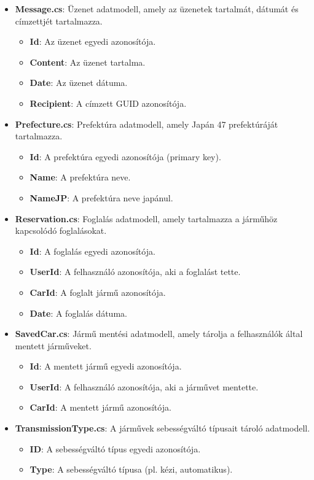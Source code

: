 \documentclass{report}[11pt]
\begin{document}
\begin{itemize}
\item \textbf{Message.cs}: Üzenet adatmodell, amely az üzenetek tartalmát, dátumát és címzettjét tartalmazza.
\begin{itemize}
    \item \textbf{Id}: Az üzenet egyedi azonosítója.
    \item \textbf{Content}: Az üzenet tartalma.
    \item \textbf{Date}: Az üzenet dátuma.
    \item \textbf{Recipient}: A címzett GUID azonosítója.
\end{itemize}

\item \textbf{Prefecture.cs}: Prefektúra adatmodell, amely Japán 47 prefektúráját tartalmazza.
\begin{itemize}
    \item \textbf{Id}: A prefektúra egyedi azonosítója (primary key).
    \item \textbf{Name}: A prefektúra neve.
    \item \textbf{NameJP}: A prefektúra neve japánul.
\end{itemize}

\item \textbf{Reservation.cs}: Foglalás adatmodell, amely tartalmazza a járműhöz kapcsolódó foglalásokat.
\begin{itemize}
    \item \textbf{Id}: A foglalás egyedi azonosítója.
    \item \textbf{UserId}: A felhasználó azonosítója, aki a foglalást tette.
    \item \textbf{CarId}: A foglalt jármű azonosítója.
    \item \textbf{Date}: A foglalás dátuma.
\end{itemize}

\item \textbf{SavedCar.cs}: Jármű mentési adatmodell, amely tárolja a felhasználók által mentett járműveket.
\begin{itemize}
    \item \textbf{Id}: A mentett jármű egyedi azonosítója.
    \item \textbf{UserId}: A felhasználó azonosítója, aki a járművet mentette.
    \item \textbf{CarId}: A mentett jármű azonosítója.
\end{itemize}

\item \textbf{TransmissionType.cs}: A járművek sebességváltó típusait tároló adatmodell.
\begin{itemize}
    \item \textbf{ID}: A sebességváltó típus egyedi azonosítója.
    \item \textbf{Type}: A sebességváltó típusa (pl. kézi, automatikus).
\end{itemize}


\end{itemize}
\end{document}
